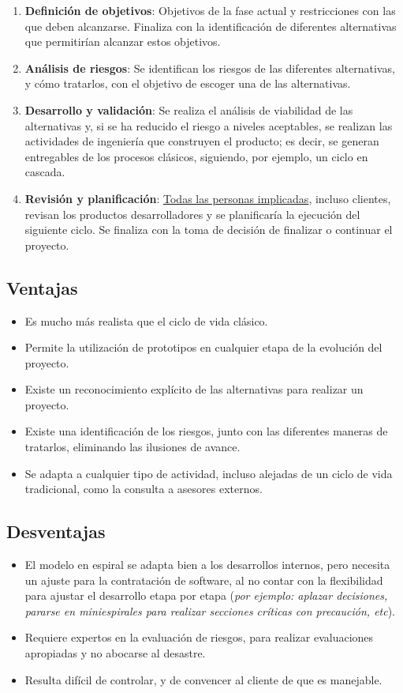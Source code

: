 \begin{enumerate}
   \item \textbf{Definición de objetivos}: Objetivos de la fase actual y restricciones con las que deben alcanzarse. Finaliza con la identificación de diferentes alternativas que permitirían alcanzar estos objetivos.
   \item \textbf{Análisis de riesgos}: Se identifican los riesgos de las diferentes alternativas, y cómo tratarlos, con el objetivo de escoger una de las alternativas.
   \item \textbf{Desarrollo y validación}: Se realiza el análisis de viabilidad de las alternativas y, si se ha reducido el riesgo a niveles aceptables, se realizan las actividades de ingeniería que construyen el producto; es decir, se generan entregables de los procesos clásicos, siguiendo, por ejemplo, un ciclo en cascada.
   \item \textbf{Revisión y planificación}: \uline{Todas las personas implicadas}, incluso clientes, revisan los productos desarrolladores y se planificaría la ejecución del siguiente ciclo. Se finaliza con la toma de decisión de finalizar o continuar el proyecto.
\end{enumerate}


\subsection{Ventajas}

\begin{itemize}
   \item Es mucho más realista que el ciclo de vida clásico.
   \item Permite la utilización de prototipos en cualquier etapa de la evolución del proyecto.
   \item Existe un reconocimiento explícito de las alternativas para realizar un proyecto.
   \item Existe una identificación de los riesgos, junto con las diferentes maneras de tratarlos, eliminando las ilusiones de avance.
   \item Se adapta a cualquier tipo de actividad, incluso alejadas de un ciclo de vida tradicional, como la consulta a asesores externos.
\end{itemize}


\subsection{Desventajas}
\begin{itemize}
   \item El modelo en espiral se adapta bien a los desarrollos internos, pero necesita un ajuste para la contratación de software, al no contar con la flexibilidad para ajustar el desarrollo etapa por etapa (\textit{por ejemplo: aplazar decisiones, pararse en miniespirales para realizar secciones críticas con precaución, etc}).
   \item Requiere expertos en la evaluación de riesgos, para realizar evaluaciones apropiadas y no abocarse al desastre.
   \item Resulta difícil de controlar, y de convencer al cliente de que es manejable.
\end{itemize}

